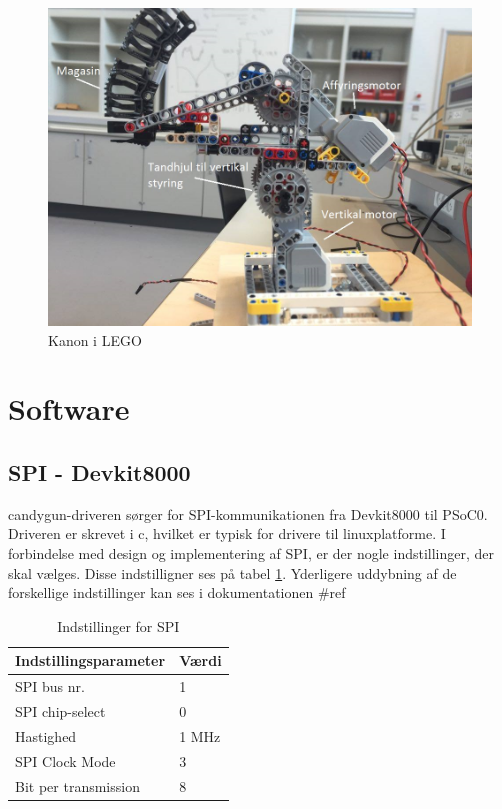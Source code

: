 \begin{figure}[H]
	\centering
	\includegraphics[width=1\textwidth]{Afsnit/DesignOgImplementering/images/kanon}
	\caption{Kanon i LEGO}
	\label{fig:kanon}
\end{figure}
 

\section{Software}

\subsection{SPI - Devkit8000}
candygun-driveren sørger for SPI-kommunikationen fra Devkit8000 til PSoC0. Driveren er skrevet i c, hvilket er typisk for drivere til linuxplatforme. I forbindelse med design og implementering af SPI, er der nogle indstillinger, der skal vælges. Disse indstilligner ses på tabel \ref{SPItabel}. Yderligere uddybning af de forskellige indstillinger kan ses i dokumentationen \#ref 

\begin{table}[H]
	\centering
	\caption{Indstillinger for SPI}
	\label{SPItabel}
	\begin{tabular}{|l|l|}
		\hline
		\textbf{Indstillingsparameter} & \textbf{Værdi} \\ \hline
		SPI bus nr.                    & 1              \\ \hline
		SPI chip-select                & 0              \\ \hline
		Hastighed                      & 1 MHz          \\ \hline
		SPI Clock Mode                 & 3              \\ \hline
		Bit per transmission           & 8              \\ \hline
	\end{tabular}
\end{table}

